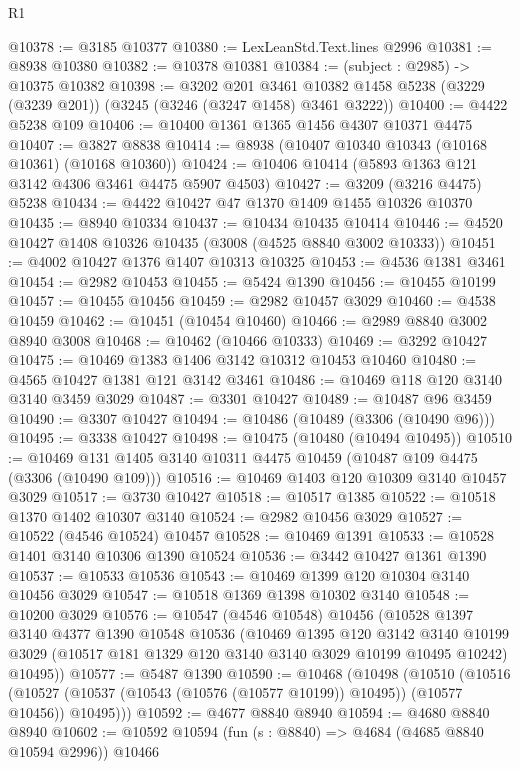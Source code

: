 \begin{lexlean}{R1}
\begin{coremodule}
@10378 := @3185 @10377
@10380 := LexLeanStd.Text.lines @2996
@10381 := @8938 @10380
@10382 := @10378 @10381
@10384 := (subject : @2985) -> @10375 @10382
@10398 := @3202
    @201
    @3461
    @10382
    @1458
    @5238
    (@3229 (@3239 @201))
    (@3245 (@3246 (@3247 @1458) @3461 @3222))
@10400 := @4422 @5238 @109
@10406 := @10400 @1361 @1365 @1456 @4307 @10371 @4475
@10407 := @3827 @8838
@10414 := @8938 (@10407 @10340 @10343 (@10168 @10361) (@10168 @10360))
@10424 := @10406 @10414 (@5893 @1363 @121 @3142 @4306 @3461 @4475 @5907 @4503)
@10427 := @3209 (@3216 @4475) @5238
@10434 := @4422 @10427 @47 @1370 @1409 @1455 @10326 @10370
@10435 := @8940 @10334
@10437 := @10434 @10435 @10414
@10446 := @4520 @10427 @1408 @10326 @10435 (@3008 (@4525 @8840 @3002 @10333))
@10451 := @4002 @10427 @1376 @1407 @10313 @10325
@10453 := @4536 @1381 @3461
@10454 := @2982 @10453
@10455 := @5424 @1390
@10456 := @10455 @10199
@10457 := @10455 @10456
@10459 := @2982 @10457 @3029
@10460 := @4538 @10459
@10462 := @10451 (@10454 @10460)
@10466 := @2989 @8840 @3002 @8940 @3008
@10468 := @10462 (@10466 @10333)
@10469 := @3292 @10427
@10475 := @10469 @1383 @1406 @3142 @10312 @10453 @10460
@10480 := @4565 @10427 @1381 @121 @3142 @3461
@10486 := @10469 @118 @120 @3140 @3140 @3459 @3029
@10487 := @3301 @10427
@10489 := @10487 @96 @3459
@10490 := @3307 @10427
@10494 := @10486 (@10489 (@3306 (@10490 @96)))
@10495 := @3338 @10427
@10498 := @10475 (@10480 (@10494 @10495))
@10510 := @10469 @131 @1405 @3140 @10311 @4475 @10459 (@10487 @109 @4475 (@3306 (@10490 @109)))
@10516 := @10469 @1403 @120 @10309 @3140 @10457 @3029
@10517 := @3730 @10427
@10518 := @10517 @1385
@10522 := @10518 @1370 @1402 @10307 @3140
@10524 := @2982 @10456 @3029
@10527 := @10522 (@4546 @10524) @10457
@10528 := @10469 @1391
@10533 := @10528 @1401 @3140 @10306 @1390 @10524
@10536 := @3442 @10427 @1361 @1390
@10537 := @10533 @10536
@10543 := @10469 @1399 @120 @10304 @3140 @10456 @3029
@10547 := @10518 @1369 @1398 @10302 @3140
@10548 := @10200 @3029
@10576 := @10547
    (@4546 @10548)
    @10456
    (@10528
      @1397
      @3140
      @4377
      @1390
      @10548
      @10536
      (@10469
        @1395
        @120
        @3142
        @3140
        @10199
        @3029
        (@10517 @181 @1329 @120 @3140 @3140 @3029 @10199 @10495 @10242)
        @10495))
@10577 := @5487 @1390
@10590 := @10468
    (@10498
      (@10510
        (@10516 (@10527 (@10537 (@10543 (@10576 (@10577 @10199)) @10495)) (@10577 @10456)) @10495)))
@10592 := @4677 @8840 @8940
@10594 := @4680 @8840 @8940
@10602 := @10592 @10594 (fun (s : @8840) => @4684 (@4685 @8840 @10594 @2996)) @10466

\end{coremodule}
\end{lexlean}
